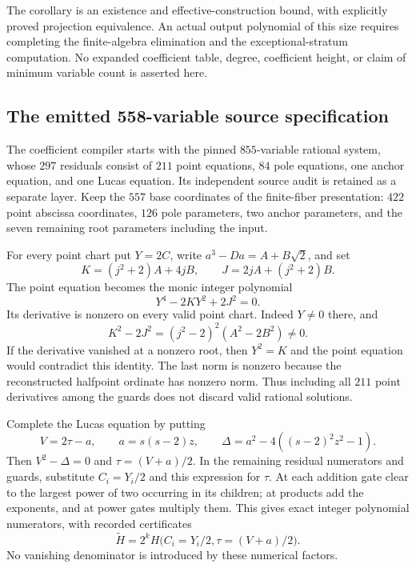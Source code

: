 \documentclass[11pt]{article}
\theoremstyle{definition}
\begin{document}
The corollary is an existence and effective-construction bound, with
explicitly proved projection equivalence.  An actual output polynomial
of this size requires completing the finite-algebra elimination and
the exceptional-stratum computation.  No expanded coefficient table,
degree, coefficient height, or claim of minimum variable count is
asserted here.



\subsection{The emitted 558-variable source specification}
\label{subsec:emitted-558-source}

The coefficient compiler starts with the pinned $855$-variable rational
system, whose $297$ residuals consist of $211$ point equations, $84$
pole equations, one anchor equation, and one Lucas equation. Its
independent source audit is retained as a separate layer. Keep the
$557$ base coordinates of the finite-fiber presentation: $422$ point
abscissa coordinates, $126$ pole parameters, two anchor parameters,
and the seven remaining root parameters including the input.

For every point chart put $Y=2C$, write
$a^3-Da=A+B\sqrt2$, and set
\[
 K=(j^2+2)A+4jB,\qquad J=2jA+(j^2+2)B.
\]
The point equation becomes the monic integer polynomial
\[
 Y^4-2KY^2+2J^2=0.
\]
Its derivative is nonzero on every valid point chart. Indeed $Y\ne0$
there, and
\[
 K^2-2J^2=(j^2-2)^2(A^2-2B^2)\ne0.
\]
If the derivative vanished at a nonzero root, then $Y^2=K$ and
the point equation would contradict this identity. The last norm
is nonzero because the reconstructed halfpoint ordinate has
nonzero norm. Thus including all $211$ point derivatives among the
guards does not discard valid rational solutions.

Complete the Lucas equation by putting
\[
 V=2\tau-a,\qquad a=s(s-2)z,\qquad
 \Delta=a^2-4((s-2)^2z^2-1).
\]
Then $V^2-\Delta=0$ and $\tau=(V+a)/2$. In the remaining
residual numerators and guards, substitute $C_i=Y_i/2$ and this
expression for $\tau$. At each addition gate clear to the largest
power of two occurring in its children; at products add the
exponents, and at power gates multiply them. This gives exact
integer polynomial numerators, with recorded certificates
\[
 \widetilde H=2^k H\bigl(C_i=Y_i/2,\tau=(V+a)/2\bigr).
\]
No vanishing denominator is introduced by these numerical factors.
\end{document}
